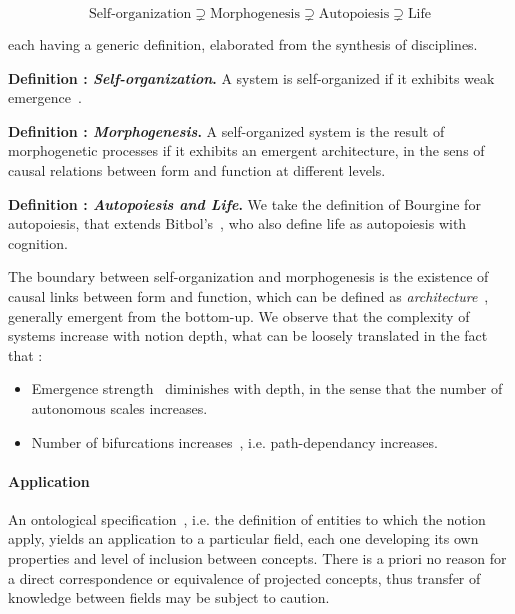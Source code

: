 \documentclass[fleqn,10pt]{wlscirep}
\begin{document}
\begin{equation}
\textrm{Self-organization} \supsetneq \textrm{Morphogenesis} \supsetneq \textrm{Autopoiesis} \supsetneq \textrm{Life}
\end{equation}


each having a generic definition, elaborated from the synthesis of disciplines.

\medskip

\textbf{Definition : \textit{Self-organization}.} A system is self-organized if it exhibits weak emergence~\cite{bedau2002downward}.

\medskip

\textbf{Definition : \textit{Morphogenesis}.} A self-organized system is the result of morphogenetic processes if it exhibits an emergent architecture, in the sens of causal relations between form and function at different levels.

\medskip

\textbf{Definition : \textit{Autopoiesis and Life}.} We take the definition of Bourgine \cite{bourgine2004autopoiesis} for autopoiesis, that extends Bitbol's~\cite{bitbol_autopoiesis_2004}, who also define life as autopoiesis with cognition.


\medskip

The boundary between self-organization and morphogenesis is the existence of causal links between form and function, which can be defined as \emph{architecture}~\cite{doursat2013review}, generally emergent from the bottom-up. We observe that the complexity of systems increase with notion depth, what can be loosely translated in the fact that :
\begin{itemize}
\item Emergence strength~\cite{bedau2002downward} diminishes with depth, in the sense that the number of autonomous scales increases.
\item Number of bifurcations increases~\cite{thom1974stabilite}, i.e. path-dependancy increases.
\end{itemize}


\paragraph{Application}

An ontological specification~\cite{livet2010ontology}, i.e. the definition of entities to which the notion apply, yields an application to a particular field, each one developing its own properties and level of inclusion between concepts. There is a priori no reason for a direct correspondence or equivalence of projected concepts, thus transfer of knowledge between fields may be subject to caution.
\end{document}
